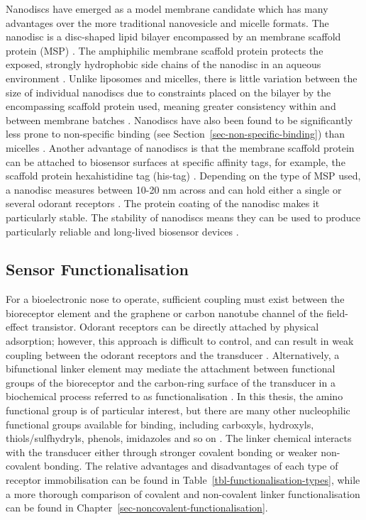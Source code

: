 \documentclass[
  a4paper,
]{scrbook}
\begin{document}
Nanodiscs have emerged as a model membrane candidate which has many
advantages over the more traditional nanovesicle and micelle formats.
The nanodisc is a disc-shaped lipid bilayer encompassed by an membrane
scaffold protein (MSP) \autocite{Nath2007,Bayburt2010,Yang2018}. The
amphiphilic membrane scaffold protein protects the exposed, strongly
hydrophobic side chains of the nanodisc in an aqueous environment
\autocite{Fruh2011,Yang2018}. Unlike liposomes and micelles, there is
little variation between the size of individual nanodiscs due to
constraints placed on the bilayer by the encompassing scaffold protein
used, meaning greater consistency within and between membrane batches
\autocite{Nath2007,Fruh2011}. Nanodiscs have also been found to be
significantly less prone to non-specific binding (see
Section~\ref{sec-non-specific-binding}) than micelles
\autocite{Fruh2011}. Another advantage of nanodiscs is that the membrane
scaffold protein can be attached to biosensor surfaces at specific
affinity tags, for example, the scaffold protein hexahistidine tag
(his-tag) \autocite{Bayburt2010,Fruh2011}. Depending on the type of MSP
used, a nanodisc measures between 10-20 nm across and can hold either a
single or several odorant receptors \autocite{Nath2007,Bayburt2010}. The
protein coating of the nanodisc makes it particularly stable. The
stability of nanodiscs means they can be used to produce particularly
reliable and long-lived biosensor devices
\autocite{Goldsmith2011,Yang2018,Moon2020,Cheema2021}.

\hypertarget{sec-sensor-types}{%
\subsection{Sensor Functionalisation}\label{sec-sensor-types}}

For a bioelectronic nose to operate, sufficient coupling must exist
between the bioreceptor element and the graphene or carbon nanotube
channel of the field-effect transistor. Odorant receptors can be
directly attached by physical adsorption; however, this approach is
difficult to control, and can result in weak coupling between the
odorant receptors and the transducer
\autocite{Kwon2015,Dung2018,Bohbot2020}. Alternatively, a bifunctional
linker element may mediate the attachment between functional groups of
the bioreceptor and the carbon-ring surface of the transducer in a
biochemical process referred to as functionalisation
\autocite{Star2003a}. In this thesis, the amino functional group is of
particular interest, but there are many other nucleophilic functional
groups available for binding, including carboxyls, hydroxyls,
thiols/sulfhydryls, phenols, imidazoles and so on
\autocite{Fruh2011,Dung2018}. The linker chemical interacts with the
transducer either through stronger covalent bonding or weaker
non-covalent bonding. The relative advantages and disadvantages of each
type of receptor immobilisation can be found in
Table~\ref{tbl-functionalisation-types}, while a more thorough
comparison of covalent and non-covalent linker functionalisation can be
found in Chapter~\ref{sec-noncovalent-functionalisation}.
\end{document}
